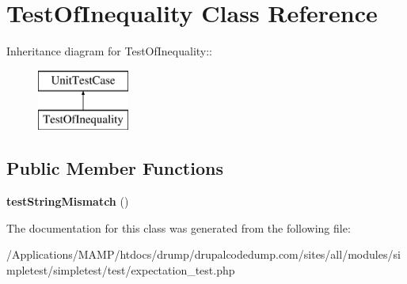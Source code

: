 \hypertarget{class_test_of_inequality}{
\section{TestOfInequality Class Reference}
\label{class_test_of_inequality}
}
Inheritance diagram for TestOfInequality::\begin{figure}[H]
\begin{center}
\leavevmode
\includegraphics[height=2cm]{class_test_of_inequality}
\end{center}
\end{figure}
\subsection*{Public Member Functions}
\begin{DoxyCompactItemize}
\item 
\hypertarget{class_test_of_inequality_a0545daa22f190657270f0fae24aa3f59}{
{\bfseries testStringMismatch} ()}
\label{class_test_of_inequality_a0545daa22f190657270f0fae24aa3f59}

\end{DoxyCompactItemize}


The documentation for this class was generated from the following file:\begin{DoxyCompactItemize}
\item 
/Applications/MAMP/htdocs/drump/drupalcodedump.com/sites/all/modules/simpletest/simpletest/test/expectation\_\-test.php\end{DoxyCompactItemize}

